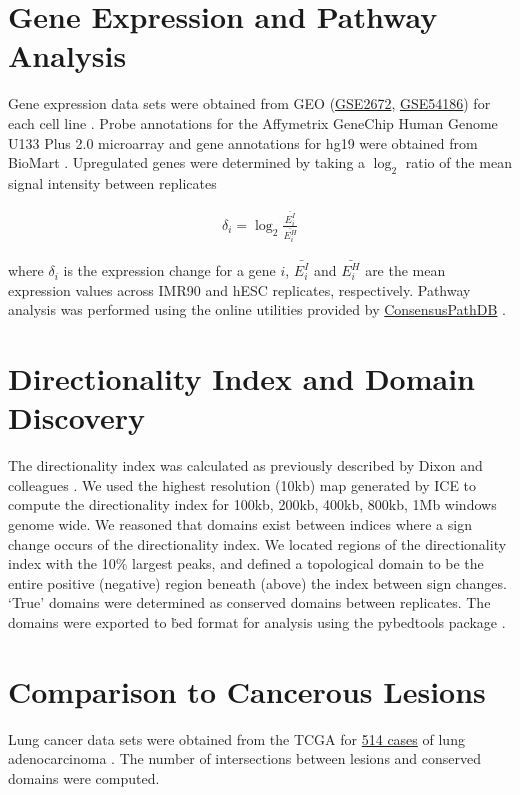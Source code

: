 \section*{Gene Expression and Pathway Analysis}

Gene expression data sets were obtained from \gls{GEO} (\href{http://www.ncbi.nlm.nih.gov/geo/query/acc.cgi?acc=GSE2672}{GSE2672},
\href{http://www.ncbi.nlm.nih.gov/geo/query/acc.cgi?acc=GSE54186}{GSE54186}) for each cell line \citep{kim2005} \citep{kim2014}.  Probe
annotations for the Affymetrix GeneChip Human Genome U133 Plus 2.0 microarray and gene annotations for hg19 were obtained from
BioMart \citep{kasprzyk2011}.  Upregulated genes were determined by taking a $\log_2$ ratio of the mean signal intensity between
replicates

\begin{align}
  \delta_i = \log_2{\frac{\bar{E_i^I}}{\bar{E_i^H}}}
\end{align}

where $\delta_i$ is the expression change for a gene $i$, $\bar{E_i^I}$ and $\bar{E_i^H}$ are the mean expression values across
IMR90 and hESC replicates, respectively.  Pathway analysis was performed using the online utilities provided by
\href{http://consensuspathdb.org/}{ConsensusPathDB} \citep{kamburov2012}.

\section*{Directionality Index and Domain Discovery}

The directionality index was calculated as previously described by Dixon and colleagues \citep{dixon2012}.  We used the highest
resolution (10kb) map generated by \gls{ICE} to compute the directionality index for 100kb, 200kb, 400kb, 800kb, 1Mb windows
genome wide.  We reasoned that domains exist between indices where a sign change occurs of the directionality index.  We located
regions of the directionality index with the 10\% largest peaks, and defined a topological domain to be the entire positive (negative)
region beneath (above) the index between sign changes.   `True' domains were determined as conserved domains between replicates.
The domains were exported to \.bed format for analysis using the pybedtools package \citep{quinlan2010,dale2011}.

\section*{Comparison to Cancerous Lesions}

Lung cancer data sets were obtained from the \gls{TCGA} for
\href{https://tcga-data.nci.nih.gov/tcga/tcgaCancerDetails.jsp?diseaseType=LUAD&diseaseName=Lung\%20adenocarcinoma}{514 cases}
of lung adenocarcinoma \citep{cerami2012,gao2013}.  The number of intersections between lesions and conserved domains were computed.

